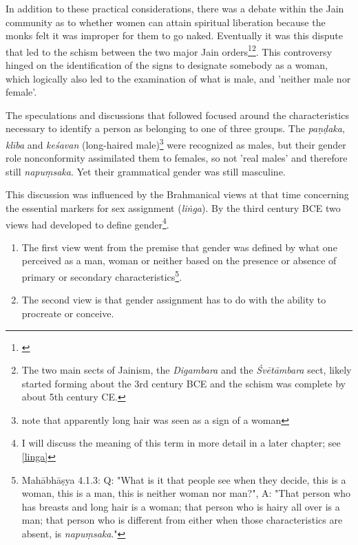 In addition to these practical considerations, there was a debate within the Jain community as to whether women can attain spiritual liberation because the monks felt it was improper for them to go naked. Eventually it was this dispute that led to the schism between the two major Jain orders\footnote{\cite{dudas}}\footnote{The two main sects of Jainism, the {\em Digambara} and the {\em Śvētāmbara} sect, likely started forming about the 3rd century BCE and the schism was complete by about 5th century CE.}. This controversy hinged on the identification of the signs to designate somebody as a woman, which logically also led to the examination of what is male, and 'neither male nor female'. 

The speculations and discussions that followed focused around the characteristics necessary to identify a person as belonging to one of three groups. The {\em paṇḍaka}, {\em klība} and {\em keśavan} (long-haired male)\footnote{note that apparently long hair was seen as a sign of a woman} were recognized as males, but their gender role nonconformity assimilated them to females, so not 'real males' and therefore still {\em napuṃsaka}. Yet their grammatical gender was still masculine.

This discussion was influenced by the Brahmanical views at that time concerning the essential markers for sex assignment ({\em liṅga}). By the third century BCE two views had developed to define gender\footnote{I will discuss the meaning of this term in more detail in a later chapter; see \ref{linga}}.
\begin{enumerate}
 \item The first view went from the premise that gender was defined by what one perceived as a man, woman or neither based on the presence or absence of primary or secondary characteristics\footnote{Mahābhāṣya 4.1.3: Q: "What is it that people see when they decide, this is a woman, this is a man, this is neither woman nor man?", A: "That person who has breasts and long hair is a woman; that person who is hairy all over is a man; that person who is different from either when those characteristics are absent, is {\em napuṃsaka}."}.
 \item The second view is that gender assignment has to do with the ability to procreate or conceive. 
\end{enumerate}

